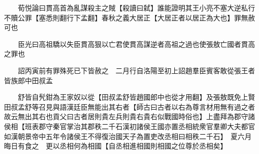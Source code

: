 　　荀悦論曰貫高首為亂謀殺主之賊【殺讀曰弑】誰能證明其王小亮不塞大逆私行不贖公罪【塞悉則翻行下孟翻】春秋之義大居正【大居正者以居正為大也】罪無赦可也

　　臣光曰高祖驕以失臣貫高狠以亡君使貫高謀逆者高祖之過也使張敖亡國者貫高之罪也

　　詔丙寅前有罪殊死已下皆赦之　二月行自洛陽至初上詔趙羣臣賓客敢從張王者皆族郎中田叔孟

　　舒皆自髠鉗為王家奴以從【田叔孟舒皆趙國郎中也從才用翻】及張敖既免上賢田叔孟舒等召見與語漢廷臣無能出其右者【師古曰古者以右為尊言材用無有過之者故云無出其右也貢父曰古者居則貴左兵則貴右貴右似戰國時俗也】上盡拜為郡守諸侯相【班表郡守秦官掌治其郡秩二千石漢初諸侯王國亦置丞相統衆官羣卿大夫都官如漢朝景帝中五年令諸侯王不得復治國天子為置吏改丞相曰相秩二千石】　夏六月晦日有食之　更以丞相何為相國【自丞相進相國則相國之位尊於丞相矣】


